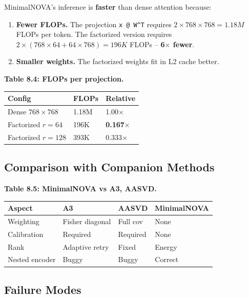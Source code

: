 MinimalNOVA's inference is \textbf{faster} than dense attention because:

\begin{enumerate}
\item \textbf{Fewer FLOPs.} The projection \texttt{x @ W^T} requires $2 \times 768 \times 768 = 1.18M$
  FLOPs per token. The factorized version requires $2 \times (768 \times 64 + 64 \times 768) = 196K$
  FLOPs -- \textbf{6$\times$ fewer}.
\item \textbf{Smaller weights.} The factorized weights fit in L2 cache better.

\end{enumerate}
\textbf{Table 8.4: FLOPs per projection.}

\begin{table}[H]
\centering
\small
\begin{tabular}{lll}
\toprule
\textbf{Config} & \textbf{FLOPs} & \textbf{Relative} \\
\midrule
Dense $768 \times 768$ & 1.18M & 1.00$\times$ \\
Factorized $r=64$ & 196K & \textbf{0.167$\times$} \\
Factorized $r=128$ & 393K & 0.333$\times$ \\
\bottomrule
\end{tabular}
\end{table}

\subsection{Comparison with Companion Methods}

\textbf{Table 8.5: MinimalNOVA vs A3, AASVD.}

\begin{table}[H]
\centering
\small
\begin{tabular}{llll}
\toprule
\textbf{Aspect} & \textbf{A3} & \textbf{AASVD} & \textbf{MinimalNOVA} \\
\midrule
Weighting & Fisher diagonal & Full cov & None \\
Calibration & Required & Required & None \\
Rank & Adaptive retry & Fixed & Energy \\
Nested encoder & Buggy & Buggy & Correct \\
\bottomrule
\end{tabular}
\end{table}

\subsection{Failure Modes}

